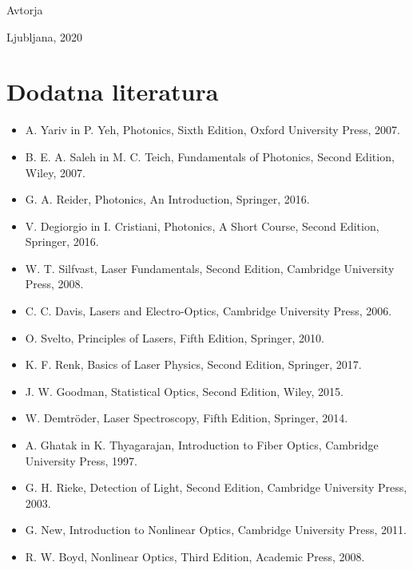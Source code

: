 \documentclass[11pt,fleqn]{book} %
\begin{document}
\vspace{1em}

Avtorja

\hfill Ljubljana, 2020





\chapter*{Dodatna literatura}

\begin{itemize}
\setlength\itemsep{0.5em}
 \item A. Yariv in P. Yeh, Photonics, Sixth Edition, Oxford University Press, 2007.
 \item B. E. A. Saleh in M. C. Teich, Fundamentals of Photonics, Second Edition, Wiley, 2007. 
 \item G. A. Reider, Photonics, An Introduction, Springer, 2016.
 \item V. Degiorgio in I. Cristiani, Photonics, A Short Course, Second Edition, Springer, 2016.
 \item W. T. Silfvast, Laser Fundamentals, Second Edition, Cambridge University Press, 2008. 
 \item C. C. Davis, Lasers and Electro-Optics, Cambridge University Press, 2006.
 \item O. Svelto, Principles of Lasers, Fifth Edition, Springer, 2010.
 \item K. F. Renk, Basics of Laser Physics, Second Edition, Springer, 2017.
 \item J. W. Goodman, Statistical Optics, Second Edition, Wiley, 2015.
 \item W. Demtr\"oder, Laser Spectroscopy, Fifth Edition, Springer, 2014.
 \item A. Ghatak in K. Thyagarajan, Introduction to Fiber Optics, Cambridge University Press, 1997.
 \item G. H. Rieke, Detection of Light, Second Edition, Cambridge University Press, 2003.
 \item G. New, Introduction to Nonlinear Optics, Cambridge University Press, 2011.
 \item R. W. Boyd, Nonlinear Optics, Third Edition, Academic Press, 2008.
\end{itemize}
\end{document}
